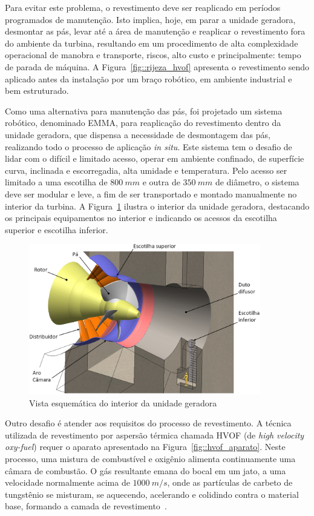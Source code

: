 Para evitar este problema, o revestimento deve ser reaplicado em períodos
programados de manutenção. Isto implica, hoje, em parar a unidade geradora,
desmontar as pás, levar até a área de manutenção e reaplicar o revestimento fora
do ambiente da turbina, resultando em um procedimento de alta complexidade
operacional de manobra e transporte, riscos, alto custo e principalmente: tempo
de parada de máquina. A Figura~\ref{fig::rijeza_hvof}
apresenta o revestimento sendo aplicado antes da instalação por um braço
robótico, em ambiente industrial e bem estruturado.

Como uma alternativa para manutenção das pás, foi projetado um sistema robótico,
denominado EMMA, para reaplicação do revestimento dentro da unidade geradora,
que dispensa a necessidade de desmontagem das pás, realizando todo o processo de
aplicação \textit{in situ}. Este sistema tem o desafio de lidar com o difícil
e limitado acesso, operar em ambiente confinado, de superfície curva, inclinada
e escorregadia, alta umidade e temperatura. Pelo acesso ser limitado a uma
escotilha de $800~mm$ e outra de $350~mm$ de diâmetro, o sistema deve ser
modular e leve, a fim de ser transportado e montado manualmente no interior da
turbina. A Figura~\ref{fig::turbina_ug} ilustra o interior da unidade geradora,
destacando os principais equipamentos no interior e indicando os acessos da
escotilha superior e escotilha inferior.

\begin{figure}[h]
	\centering 
 	\includegraphics[width=0.90\textwidth]{figs/turbina_ug}
 	\caption{Vista esquemática do interior da unidade geradora}
 	\label{fig::turbina_ug}
\end{figure}

Outro desafio é atender aos requisitos do processo de revestimento. A técnica
utilizada de revestimento por aspersão térmica chamada HVOF (de \textit{high
velocity oxy-fuel}) requer o aparato apresentado na
Figura~\ref{fig::hvof_aparato}. Neste processo, uma mistura de combustível e
oxigênio alimenta continuamente uma câmara de combustão. O gás
resultante emana do bocal em um jato, a uma velocidade normalmente acima de
$1000~m/s$, onde as partículas de carbeto de tungstênio se misturam, se
aquecendo, acelerando e colidindo contra o material base, formando a camada de
revestimento~\cite{kuroda2008warm}.

